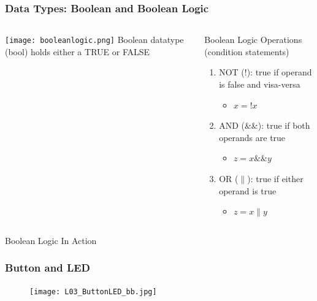 \documentclass{beamer}
\begin{document}
\begin{frame}\frametitle{Data Types: Boolean and Boolean Logic}
\begin{columns}
\begin{column}{4cm}
\texttt{[image: booleanlogic.png]}
Boolean datatype (bool) holds either a TRUE or FALSE
\end{column}
\begin{column}{6cm}
Boolean Logic Operations (condition statements)
\begin{enumerate}
\item NOT (!): true if operand is false and visa-versa
	\begin{itemize}
	\item $x =  !x$
	\end{itemize}
\item AND (\&\&): true if both operands are true
	\begin{itemize}
	\item $z = x \&\& y$
	\end{itemize}
\item OR ($\parallel$): true if either operand is true
	\begin{itemize}
	\item $z = x \parallel y$
	\end{itemize}
\end{enumerate}
\end{column}
\end{columns}
\end{frame}

\begin{frame}{Boolean Logic In Action}
\lstbool
\end{frame}

\begin{frame}\frametitle{Button and LED}
\begin{figure}[h]
	\texttt{[image: L03\_ButtonLED\_bb.jpg]}
\end{figure}
\end{frame}
\end{document}
